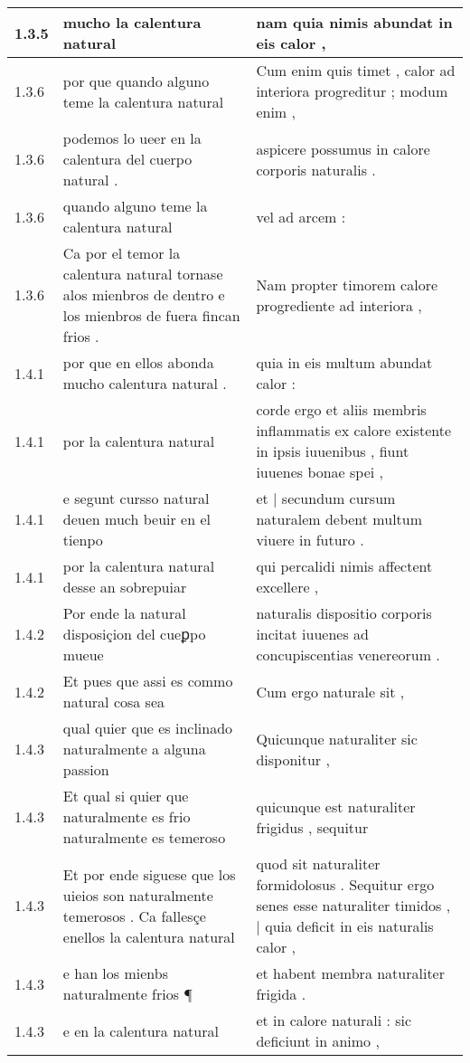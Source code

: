 \begin{tabular}{|p{1cm}|p{6.5cm}|p{6.5cm}|}
1.3.5 & mucho la calentura natural & nam quia nimis abundat in eis calor , \\\hline
1.3.6 & por que quando alguno teme la calentura natural & Cum enim quis timet , calor ad interiora progreditur ; modum enim , \\\hline
1.3.6 & podemos lo ueer en la calentura del cuerpo natural . & aspicere possumus in calore corporis naturalis . \\\hline
1.3.6 & quando alguno teme la calentura natural & vel ad arcem : \\\hline
1.3.6 & Ca por el temor la calentura natural tornase alos mienbros de dentro e los mienbros de fuera fincan frios . & Nam propter timorem calore progrediente ad interiora , \\\hline
1.4.1 & por que en ellos abonda mucho calentura natural . & quia in eis multum abundat calor : \\\hline
1.4.1 & por la calentura natural & corde ergo et aliis membris inflammatis ex calore existente in ipsis iuuenibus , fiunt iuuenes bonae spei , \\\hline
1.4.1 & e segunt cursso natural deuen much beuir en el tienpo & et | secundum cursum naturalem debent multum viuere in futuro . \\\hline
1.4.1 & por la calentura natural desse an sobrepuiar & qui percalidi nimis affectent excellere , \\\hline
1.4.2 & Por ende la natural disposiçion del cueꝑpo mueue & naturalis dispositio corporis incitat iuuenes ad concupiscentias venereorum . \\\hline
1.4.2 & Et pues que assi es commo natural cosa sea & Cum ergo naturale sit , \\\hline
1.4.3 & qual quier que es inclinado naturalmente a alguna passion & Quicunque naturaliter sic disponitur , \\\hline
1.4.3 & Et qual si quier que naturalmente es frio naturalmente es temeroso & quicunque est naturaliter frigidus , sequitur \\\hline
1.4.3 & Et por ende siguese que los uieios son naturalmente temerosos . Ca fallesçe enellos la calentura natural & quod sit naturaliter formidolosus . Sequitur ergo senes esse naturaliter timidos , | quia deficit in eis naturalis calor , \\\hline
1.4.3 & e han los mienbs naturalmente frios ¶ & et habent membra naturaliter frigida . \\\hline
1.4.3 & e en la calentura natural & et in calore naturali : sic deficiunt in animo , \\\hline

\end{tabular}
